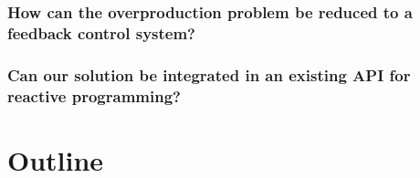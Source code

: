 \subsubsection*{How can the overproduction problem be reduced to a feedback control system?}

\subsubsection*{Can our solution be integrated in an existing API for reactive programming?}

\section*{Outline}

